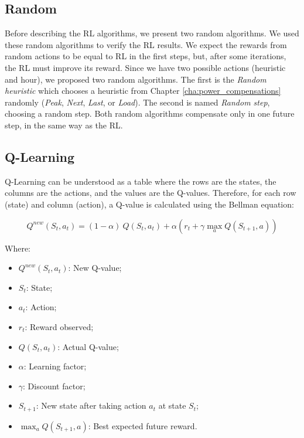\subsection{Random}
Before describing the RL algorithms, we present two random algorithms. We used these random algorithms to verify the RL results. We expect the rewards from random actions to be equal to RL in the first steps, but, after some iterations, the RL must improve its reward. Since we have two possible actions (heuristic and hour), we proposed two random algorithms. The first is the \emph{Random heuristic} which chooses a heuristic from Chapter \ref{cha:power_compensations} randomly (\emph{Peak}, \emph{Next}, \emph{Last}, or \emph{Load}). The second is named \emph{Random step}, choosing a random step. Both random algorithms compensate only in one future step, in the same way as the RL.

\subsection{Q-Learning}
Q-Learning can be understood as a table where the rows are the states, the columns are the actions, and the values are the Q-values. Therefore, for each row (state) and column (action), a Q-value is calculated using the Bellman equation:

\begin{equation}
    Q^{new}(S_t, a_t) = (1 - \alpha)\ Q(S_t, a_t) + \alpha (r_t + \gamma \max_a Q(S_{t+1}, a) )
\end{equation}

Where:
\begin{itemize}
    \item $Q^{new}(S_t, a_t)$: New Q-value;
    \item $S_t$: State;
    \item $a_t$: Action;
    \item $r_t$: Reward observed;
    \item $Q(S_t, a_t)$: Actual Q-value;
    \item $\alpha$: Learning factor;
    \item $\gamma$: Discount factor;
    \item $S_{t+1}$: New state after taking action $a_t$ at state $S_t$;
    \item $\max_a Q(S_{t+1}, a)$: Best expected future reward.
\end{itemize}

